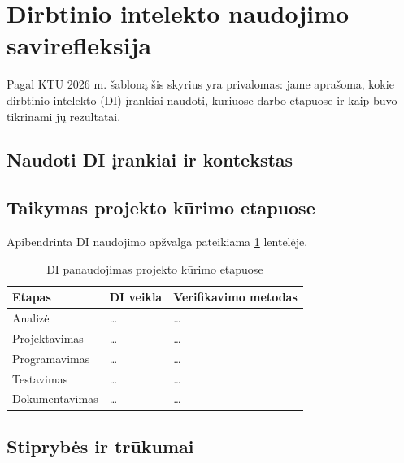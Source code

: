 \section{Dirbtinio intelekto naudojimo savirefleksija}

Pagal KTU 2026 m. šabloną šis skyrius yra privalomas: jame aprašoma, kokie dirbtinio intelekto (DI) įrankiai naudoti, kuriuose darbo etapuose ir kaip buvo tikrinami jų rezultatai.

\subsection{Naudoti DI įrankiai ir kontekstas}

\lipsum[1]

\subsection{Taikymas projekto kūrimo etapuose}

Apibendrinta DI naudojimo apžvalga pateikiama \ref{tab:di-etapai} lentelėje.

\begin{table}[!ht]
\caption{DI panaudojimas projekto kūrimo etapuose}
\label{tab:di-etapai}
\centering
\begin{tabular}{|p{2.6cm}|p{6.8cm}|p{5.8cm}|} \toprule
\textbf{Etapas} & \textbf{DI veikla} & \textbf{Verifikavimo metodas} \\ \midrule
Analizė & \ldots & \ldots \\ \hline
Projektavimas & \ldots & \ldots \\ \hline
Programavimas & \ldots & \ldots \\ \hline
Testavimas & \ldots & \ldots \\ \hline
Dokumentavimas & \ldots & \ldots \\ \bottomrule
\end{tabular}
\end{table}

\subsection{Stiprybės ir trūkumai}

\lipsum[2]
